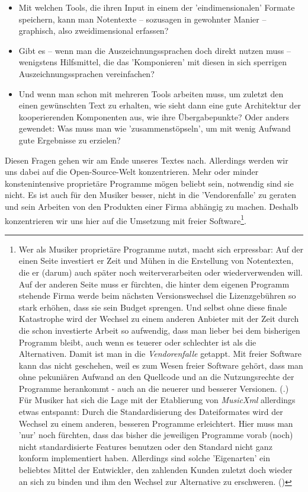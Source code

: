 \begin{itemize}
  \item Mit welchen Tools, die ihren Input in einem der 'eindimensionalen'
  Formate speichern, kann man Notentexte -- sozusagen in gewohnter Manier
  -- graphisch, also zweidimensional erfassen?
  \item Gibt es -- wenn man die Auszeichnungssprachen doch direkt nutzen muss --
  wenigstens Hilfsmittel, die das 'Komponieren' mit diesen in sich sperrigen
  Auszeichnungssprachen vereinfachen?
  \item Und wenn man schon mit mehreren Tools arbeiten muss, um zuletzt den
  einen gewünschten Text zu erhalten, wie sieht dann eine gute Architektur der
  kooperierenden Komponenten aus, wie ihre Übergabepunkte? Oder anders gewendet:
  Was muss man wie 'zusammenstöpseln', um mit wenig Aufwand gute Ergebnisse zu
  erzielen?
\end{itemize}

Diesen Fragen gehen wir am Ende unseres Textes nach. Allerdings werden wir uns
dabei auf die Open-Source-Welt konzentrieren. Mehr oder minder konstenintensive
proprietäre Programme mögen beliebt sein, notwendig sind sie nicht. Es ist auch
für den Musiker besser, nicht in die 'Vendorenfalle' zu geraten und sein Arbeiten
von den Produkten einer Firma abhängig zu machen. Deshalb konzentrieren wir uns
hier auf die Umsetzung mit freier Software\footnote{Wer als Musiker proprietäre
Programme nutzt, macht sich erpressbar: Auf der einen Seite investiert er Zeit
und Mühen in die Erstellung von Notentexten, die er (darum) auch später noch
weiterverarbeiten oder wiederverwenden will. Auf der anderen Seite muss er
fürchten, die hinter dem eigenen Programm stehende Firma werde beim nächsten
Versionswechsel die Lizenzgebühren so stark erhöhen, dass sie sein Budget
sprengen. Und selbst ohne diese finale Katastrophe wird der Wechsel zu einem
anderen Anbieter mit der Zeit durch die schon investierte Arbeit so aufwendig,
dass man lieber bei dem bisherigen Programm bleibt, auch wenn es teuerer oder
schlechter ist als die Alternativen. Damit ist man in die \textit{Vendorenfalle}
getappt. Mit freier Software kann das nicht geschehen, weil es zum Wesen freier
Software gehört, dass man ohne pekuniären Aufwand an den Quellcode und an die
Nutzungsrechte der Programme herankommt - auch an die neuerer und besserer
Versionen. (\cite[vgl. dazu][\nopage wp]{FSF2018a}.) Für Musiker hat sich die
Lage mit der Etablierung von \textit{MusicXml} allerdings etwas entspannt: Durch
die Standardisierung des Dateiformates wird der Wechsel zu einem anderen,
besseren Programme erleichtert. Hier muss man 'nur' noch fürchten, dass das
bisher die jeweiligen Programme vorab (noch) nicht standardisierte Features
benutzen oder den Standard nicht ganz konform implementiert haben. Allerdings
sind solche 'Eigenarten' ein beliebtes Mittel der Entwickler, den zahlenden
Kunden zuletzt doch wieder an sich zu binden und ihm den Wechsel zur Alternative
zu erschweren. (\cite[Zur Lizenzierung von MusicXml vgl. auch][\nopage
wp.]{WpedMusicXML2018a})}.

